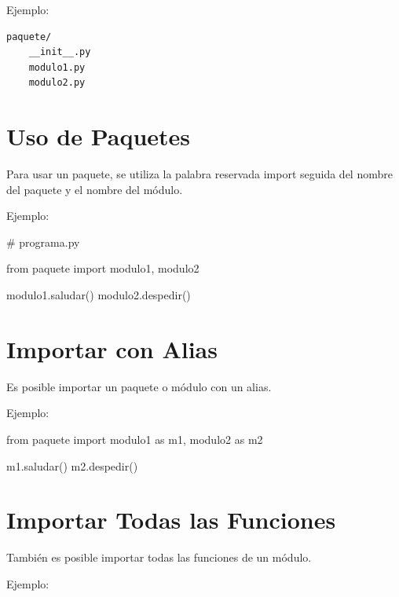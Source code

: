 \documentclass[
  a4paper,
  DIV=11,
  numbers=noendperiod,
  onepage,
  openany]{scrreprt}
\newenvironment{Shaded}{\begin{snugshade}}{\end{snugshade}}
\newcommand{\CommentTok}[1]{\textcolor[rgb]{0.37,0.37,0.37}{#1}}
\newcommand{\ImportTok}[1]{\textcolor[rgb]{0.00,0.46,0.62}{#1}}
\newcommand{\NormalTok}[1]{\textcolor[rgb]{0.00,0.23,0.31}{#1}}
\begin{document}
\begin{tcolorbox}
Ejemplo:

\begin{verbatim}
paquete/
    __init__.py
    modulo1.py
    modulo2.py
\end{verbatim}

\section{Uso de Paquetes}\label{uso-de-paquetes}

Para usar un paquete, se utiliza la palabra reservada import seguida del
nombre del paquete y el nombre del módulo.

Ejemplo:

\begin{Shaded}
\begin{Highlighting}[]
\CommentTok{\# programa.py}

\ImportTok{from}\NormalTok{ paquete }\ImportTok{import}\NormalTok{ modulo1, modulo2}

\NormalTok{modulo1.saludar()}
\NormalTok{modulo2.despedir()}
\end{Highlighting}
\end{Shaded}

\section{Importar con Alias}\label{importar-con-alias-1}

Es posible importar un paquete o módulo con un alias.

Ejemplo:

\begin{Shaded}
\begin{Highlighting}[]

\ImportTok{from}\NormalTok{ paquete }\ImportTok{import}\NormalTok{ modulo1 }\ImportTok{as}\NormalTok{ m1, modulo2 }\ImportTok{as}\NormalTok{ m2}

\NormalTok{m1.saludar()}
\NormalTok{m2.despedir()}
\end{Highlighting}
\end{Shaded}

\section{Importar Todas las
Funciones}\label{importar-todas-las-funciones-1}

También es posible importar todas las funciones de un módulo.

Ejemplo:


\end{tcolorbox}
\end{document}
